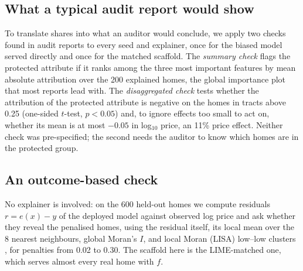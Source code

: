 \documentclass[11pt]{article}
\newcommand{\1}{\mathbf{1}}
\begin{document}
\subsection{What a typical audit report would show}
To translate shares into what an auditor would conclude, we apply two checks found in audit reports to every seed
and explainer, once for the biased model served directly and once for the matched scaffold. The \emph{summary check}
flags the protected attribute if it ranks among the three most important features by mean absolute attribution over
the 200 explained homes, the global importance plot that most reports lead with. The \emph{disaggregated check}
tests whether the attribution of the protected attribute is negative on the homes in tracts above 0.25 (one-sided
$t$-test, $p < 0.05$) and, to ignore effects too small to act on, whether its mean is at most $-0.05$ in log$_{10}$
price, an 11\% price effect. Neither check was pre-specified; the second needs the auditor to know which homes are
in the protected group.

\subsection{An outcome-based check}
No explainer is involved: on the 600 held-out homes we compute residuals $r = e(x) - y$ of the deployed model against
observed log price and ask whether they reveal the penalised homes, using the residual itself, its local mean over
the 8 nearest neighbours, global Moran's $I$, and local Moran (LISA) low--low clusters
\citep{moran1950,anselin1995lisa}, for penalties from 0.02 to 0.30. The scaffold here is the LIME-matched one, which
serves almost every real home with $f$.
\end{document}
